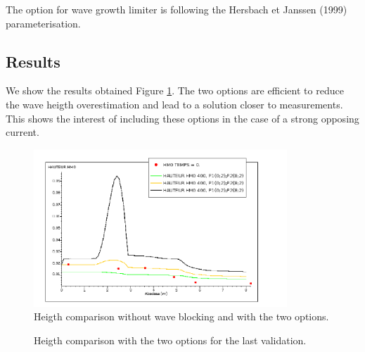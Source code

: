 The option for wave growth limiter is following the Hersbach et Janssen (1999) parameterisation.

%
%
\subsection{Results}
%
We show the results obtained Figure \ref{reswaveblocking}. The two options are efficient to reduce the wave heigth overestimation and lead to a solution closer to measurements. This shows the interest of including these options in the case of a strong opposing current.

\begin{figure} [!h]
\centering
\includegraphics[width=0.85\textwidth]{hauteur.png}
 \caption{Heigth comparison without wave blocking and with the two options.}
\label{reswaveblocking}
\end{figure}

\begin{figure} [!h]
\centering
{}
 \caption{Heigth comparison with the two options for the last validation.}
\label{reswaveblocking2}
\end{figure}



